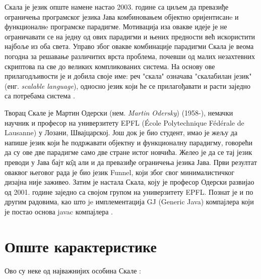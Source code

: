 \documentclass[12pt,oneside]{memoir}
\begin{document}
Скала је језик опште намене настао 2003. године са циљем да превазиђе ограничења програмског језика Јава комбиновањем објектно оријентисанe и функционалнe програмске парадигме. Мотивација иза овакве идеје је не ограничавати се на једну од ових парадигми и њених предности већ искористити најбоље из оба света. Управо због овакве комбинације парадигми Скала је веома погодна за решавање различитих врста проблема, почевши од малих незахтевних скриптова па све до великих компликованих система. На основу ове прилагодљивости је и добила своје име: реч "скала" означава "скалабилан језик" (енг. \textit{scalable language}), односно језик који ће се прилагођавати и расти заједно са потребама система \cite{progInScala}.
\par Творац Скале је Мартин Одерски (нем. \textit{Martin Odersky}) (1958-), немачки научник и професор на универзитету EPFL (École Polytechnique Fédérale de Lausanne) у Лозани, Швајцарској. Још док је био студент, имао је жељу да напише језик који ће подржавати објектну и функционалну парадигму, говорећи да су ове две парадигме само две стране истог новчића. Желео је да се тај језик преводи у Јава бајт к\^{о}д али и да превазиђе ограничења језика Јава. Први резултат оваквог његовог рада је био језик Funnel, који због свог минималистичког дизајна није заживео. Затим је настала Скала, коју је професор Одерски развијао од 2001. године заједно са својом групом на универзитету EPFL. Познат је и по другим радовима, као што je имплементација GJ (Generic Java) компајлера који је постао основа javac компајлера \cite{MartinEpfl, ScalaHistory}.

\section{Опште карактеристике}
\label{sec:opsteKarakt}

Ово су неке од најважнијих особина Скале \cite{progInScala}:
\end{document}
